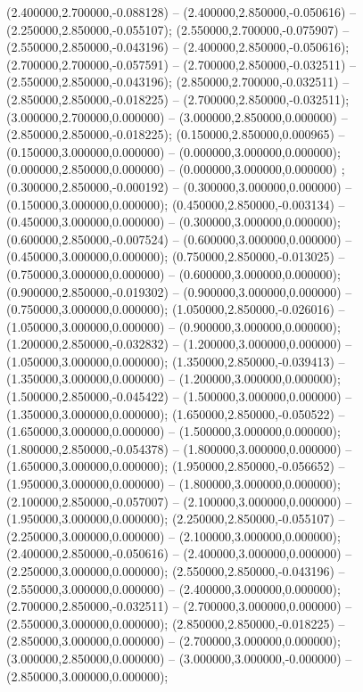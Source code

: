  (2.400000,2.700000,-0.088128) -- (2.400000,2.850000,-0.050616) -- (2.250000,2.850000,-0.055107);
 (2.550000,2.700000,-0.075907) -- (2.550000,2.850000,-0.043196) -- (2.400000,2.850000,-0.050616);
 (2.700000,2.700000,-0.057591) -- (2.700000,2.850000,-0.032511) -- (2.550000,2.850000,-0.043196);
 (2.850000,2.700000,-0.032511) -- (2.850000,2.850000,-0.018225) -- (2.700000,2.850000,-0.032511);
 (3.000000,2.700000,0.000000) -- (3.000000,2.850000,0.000000) -- (2.850000,2.850000,-0.018225);
 (0.150000,2.850000,0.000965) -- (0.150000,3.000000,0.000000) -- (0.000000,3.000000,0.000000);
 (0.000000,2.850000,0.000000) -- (0.000000,3.000000,0.000000) ;
 (0.300000,2.850000,-0.000192) -- (0.300000,3.000000,0.000000) -- (0.150000,3.000000,0.000000);
 (0.450000,2.850000,-0.003134) -- (0.450000,3.000000,0.000000) -- (0.300000,3.000000,0.000000);
 (0.600000,2.850000,-0.007524) -- (0.600000,3.000000,0.000000) -- (0.450000,3.000000,0.000000);
 (0.750000,2.850000,-0.013025) -- (0.750000,3.000000,0.000000) -- (0.600000,3.000000,0.000000);
 (0.900000,2.850000,-0.019302) -- (0.900000,3.000000,0.000000) -- (0.750000,3.000000,0.000000);
 (1.050000,2.850000,-0.026016) -- (1.050000,3.000000,0.000000) -- (0.900000,3.000000,0.000000);
 (1.200000,2.850000,-0.032832) -- (1.200000,3.000000,0.000000) -- (1.050000,3.000000,0.000000);
 (1.350000,2.850000,-0.039413) -- (1.350000,3.000000,0.000000) -- (1.200000,3.000000,0.000000);
 (1.500000,2.850000,-0.045422) -- (1.500000,3.000000,0.000000) -- (1.350000,3.000000,0.000000);
 (1.650000,2.850000,-0.050522) -- (1.650000,3.000000,0.000000) -- (1.500000,3.000000,0.000000);
 (1.800000,2.850000,-0.054378) -- (1.800000,3.000000,0.000000) -- (1.650000,3.000000,0.000000);
 (1.950000,2.850000,-0.056652) -- (1.950000,3.000000,0.000000) -- (1.800000,3.000000,0.000000);
 (2.100000,2.850000,-0.057007) -- (2.100000,3.000000,0.000000) -- (1.950000,3.000000,0.000000);
 (2.250000,2.850000,-0.055107) -- (2.250000,3.000000,0.000000) -- (2.100000,3.000000,0.000000);
 (2.400000,2.850000,-0.050616) -- (2.400000,3.000000,0.000000) -- (2.250000,3.000000,0.000000);
 (2.550000,2.850000,-0.043196) -- (2.550000,3.000000,0.000000) -- (2.400000,3.000000,0.000000);
 (2.700000,2.850000,-0.032511) -- (2.700000,3.000000,0.000000) -- (2.550000,3.000000,0.000000);
 (2.850000,2.850000,-0.018225) -- (2.850000,3.000000,0.000000) -- (2.700000,3.000000,0.000000);
 (3.000000,2.850000,0.000000) -- (3.000000,3.000000,-0.000000) -- (2.850000,3.000000,0.000000);

